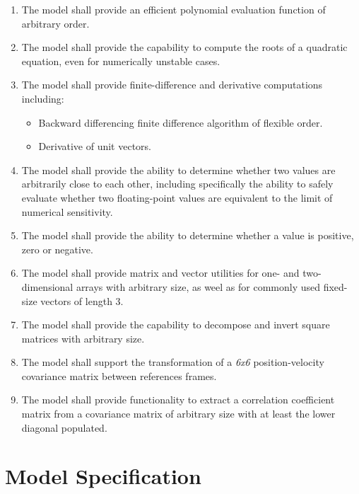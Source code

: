 \documentclass[11pt,fleqn]{report}
\begin{document}
\begin{enumerate}
\begin{itemize}
\end{itemize}
\item The model shall provide an efficient polynomial evaluation function
of arbitrary order.
\item The model shall provide the capability to compute the roots of a 
quadratic equation, even for numerically unstable cases.
\item The model shall provide finite-difference and derivative
computations including:
\begin{itemize}
\item Backward differencing finite difference algorithm of
flexible order.
\item Derivative of unit vectors.
\end{itemize}
\item The model shall provide the ability to determine whether two values
are arbitrarily close to each other, including specifically the
ability to safely evaluate whether two floating-point values are
equivalent to the limit of numerical sensitivity.
\item The model shall provide the ability to determine whether a value is
positive, zero or negative.
\item The model shall provide matrix and vector utilities for
one- and two-dimensional arrays with arbitrary size, as weel as for 
commonly used fixed-size vectors of length 3.
\item The model shall provide the capability to decompose and invert
square matrices with arbitrary size.
\item The model shall support the transformation of a \textit{6x6} 
position-velocity covariance matrix between references frames.
\item The model shall provide functionality to extract a correlation
coefficient matrix from a covariance matrix of arbitrary size
with at least the lower diagonal populated.
\end{enumerate}


\chapter{Model Specification}
\end{document}
